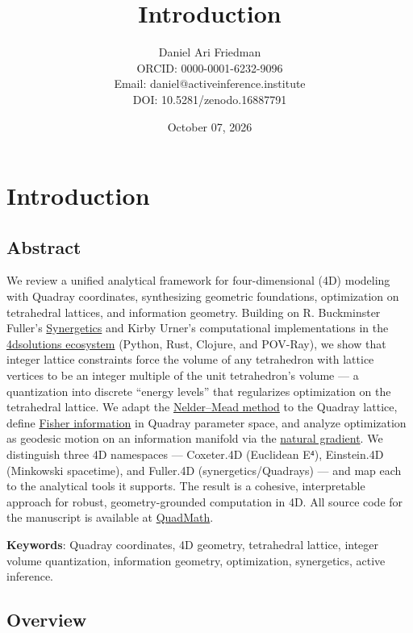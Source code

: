 \documentclass[
  10pt,
]{article}
\title{Introduction}
\author{Daniel Ari Friedman\\ ORCID: 0000-0001-6232-9096\\ Email: daniel@activeinference.institute\\ DOI: 10.5281/zenodo.16887791}
\date{October 07, 2026}
\begin{document}
\maketitle

{
\hypersetup{linkcolor=black}
\setcounter{tocdepth}{3}
\tableofcontents
}
\section{Introduction}\label{introduction}

\subsection{Abstract}\label{abstract}

We review a unified analytical framework for four-dimensional (4D)
modeling with Quadray coordinates, synthesizing geometric foundations,
optimization on tetrahedral lattices, and information geometry. Building
on R. Buckminster Fuller's
\href{https://en.wikipedia.org/wiki/Synergetics_(Fuller)}{Synergetics}
and Kirby Urner's computational implementations in the
\href{https://github.com/4dsolutions}{4dsolutions ecosystem} (Python,
Rust, Clojure, and POV-Ray), we show that integer lattice constraints
force the volume of any tetrahedron with lattice vertices to be an
integer multiple of the unit tetrahedron's volume --- a quantization
into discrete ``energy levels'' that regularizes optimization on the
tetrahedral lattice. We adapt the
\href{https://en.wikipedia.org/wiki/Nelder\%E2\%80\%93Mead_method}{Nelder--Mead
method} to the Quadray lattice, define
\href{https://en.wikipedia.org/wiki/Fisher_information}{Fisher
information} in Quadray parameter space, and analyze optimization as
geodesic motion on an information manifold via the
\href{https://en.wikipedia.org/wiki/Natural_gradient}{natural gradient}.
We distinguish three 4D namespaces --- Coxeter.4D (Euclidean E⁴),
Einstein.4D (Minkowski spacetime), and Fuller.4D (synergetics/Quadrays)
--- and map each to the analytical tools it supports. The result is a
cohesive, interpretable approach for robust, geometry-grounded
computation in 4D. All source code for the manuscript is available at
\href{https://github.com/docxology/quadmath}{QuadMath}.

\textbf{Keywords}: Quadray coordinates, 4D geometry, tetrahedral
lattice, integer volume quantization, information geometry,
optimization, synergetics, active inference.

\subsection{Overview}\label{overview}
\end{document}
